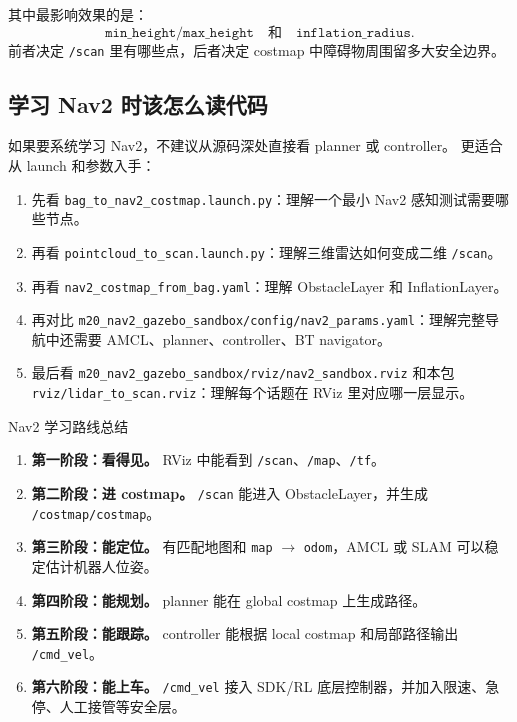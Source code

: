 \documentclass[UTF8,11pt,a4paper]{ctexart}
\begin{document}
其中最影响效果的是：
\[
\texttt{min\_height/max\_height}
\quad\text{和}\quad
\texttt{inflation\_radius}.
\]
前者决定 \texttt{/scan} 里有哪些点，后者决定 costmap 中障碍物周围留多大安全边界。

\subsection{学习 Nav2 时该怎么读代码}

如果要系统学习 Nav2，不建议从源码深处直接看 planner 或 controller。
更适合从 launch 和参数入手：

\begin{enumerate}
  \item 先看 \texttt{bag\_to\_nav2\_costmap.launch.py}：理解一个最小 Nav2 感知测试需要哪些节点。
  \item 再看 \texttt{pointcloud\_to\_scan.launch.py}：理解三维雷达如何变成二维 \texttt{/scan}。
  \item 再看 \texttt{nav2\_costmap\_from\_bag.yaml}：理解 ObstacleLayer 和 InflationLayer。
  \item 再对比 \texttt{m20\_nav2\_gazebo\_sandbox/config/nav2\_params.yaml}：理解完整导航中还需要 AMCL、planner、controller、BT navigator。
  \item 最后看 \texttt{m20\_nav2\_gazebo\_sandbox/rviz/nav2\_sandbox.rviz} 和本包 \texttt{rviz/lidar\_to\_scan.rviz}：理解每个话题在 RViz 里对应哪一层显示。
\end{enumerate}

\begin{greenbox}{Nav2 学习路线总结}
\begin{enumerate}
  \item \textbf{第一阶段：看得见。} RViz 中能看到 \texttt{/scan}、\texttt{/map}、\texttt{/tf}。
  \item \textbf{第二阶段：进 costmap。} \texttt{/scan} 能进入 ObstacleLayer，并生成 \texttt{/costmap/costmap}。
  \item \textbf{第三阶段：能定位。} 有匹配地图和 \texttt{map} \(\rightarrow\) \texttt{odom}，AMCL 或 SLAM 可以稳定估计机器人位姿。
  \item \textbf{第四阶段：能规划。} planner 能在 global costmap 上生成路径。
  \item \textbf{第五阶段：能跟踪。} controller 能根据 local costmap 和局部路径输出 \texttt{/cmd\_vel}。
  \item \textbf{第六阶段：能上车。} \texttt{/cmd\_vel} 接入 SDK/RL 底层控制器，并加入限速、急停、人工接管等安全层。
\end{enumerate}
\end{greenbox}
\end{document}
